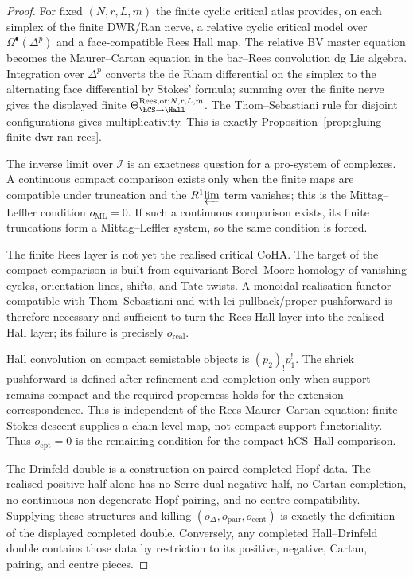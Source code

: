 \begin{proof}
For fixed $(N,r,L,m)$ the finite cyclic critical atlas provides, on
each simplex of the finite DWR/Ran nerve, a relative cyclic critical
model over $\Omega^\bullet(\Delta^p)$ and a face-compatible Rees Hall
map. The relative BV master equation becomes the Maurer--Cartan
equation in the bar--Rees convolution dg Lie algebra. Integration over
$\Delta^p$ converts the de Rham differential on the simplex to the
alternating face differential by Stokes' formula; summing over the
finite nerve gives the displayed finite
$\Theta_{\hCS\to\Hall}^{\mathrm{Rees},\mathrm{or};N,r,L,m}$. The
Thom--Sebastiani rule for disjoint configurations gives
multiplicativity. This is exactly
Proposition~\ref{prop:gluing-finite-dwr-ran-rees}.

The inverse limit over $\mathcal I$ is an exactness question for a
pro-system of complexes. A continuous compact comparison exists only
when the finite maps are compatible under truncation and the
$R^1\!\varprojlim$ term vanishes; this is the
Mittag--Leffler condition $o_{\mathrm{ML}}=0$. If such a continuous
comparison exists, its finite truncations form a Mittag--Leffler system,
so the same condition is forced.

The finite Rees layer is not yet the realised critical CoHA. The target
of the compact comparison is built from equivariant Borel--Moore
homology of vanishing cycles, orientation lines, shifts, and Tate
twists. A monoidal realisation functor compatible with
Thom--Sebastiani and with lci pullback/proper pushforward is therefore
necessary and sufficient to turn the Rees Hall layer into the realised
Hall layer; its failure is precisely $o_{\mathrm{real}}$.

Hall convolution on compact semistable objects is
$(p_2)_!p_1^!$. The shriek pushforward is defined after refinement and
completion only when support remains compact and the required
properness holds for the extension correspondence. This is independent
of the Rees Maurer--Cartan equation: finite Stokes descent supplies a
chain-level map, not compact-support functoriality. Thus
$o_{\mathrm{cpt}}=0$ is the remaining condition for the compact
hCS--Hall comparison.

The Drinfeld double is a construction on paired completed Hopf data.
The realised positive half alone has no Serre-dual negative half, no
Cartan completion, no continuous non-degenerate Hopf pairing, and no
centre compatibility. Supplying these structures and killing
$(o_\Delta,o_{\mathrm{pair}},o_{\mathrm{cent}})$ is exactly the
definition of the displayed completed double. Conversely, any completed
Hall--Drinfeld double contains those data by restriction to its
positive, negative, Cartan, pairing, and centre pieces.
\end{proof}

